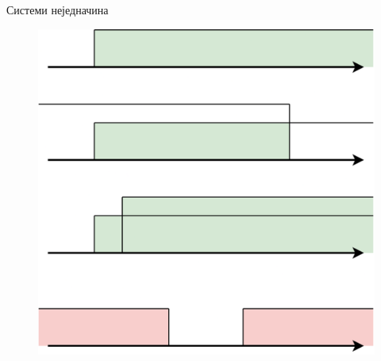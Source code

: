 \documentclass[xcolor=table]{beamer}
\begin{document}
    \begin{frame}{Системи неједначина}
        \begin{figure}
            \centering
            \includegraphics[width=\textwidth,height=0.8\textheight,keepaspectratio]{images/nejed_int.png}
        \end{figure}
    \end{frame}
\end{document}
